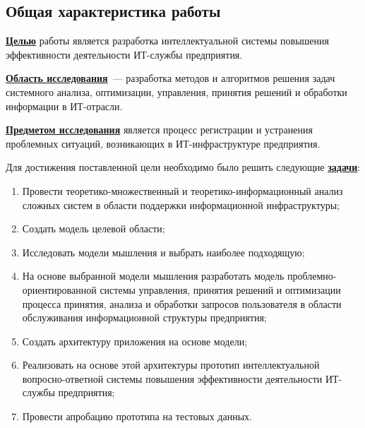 \subsection*{Общая характеристика работы}

\newcommand{\actuality}{\underline{\textbf{Актуальность темы.}}}
\newcommand{\aim}{\underline{\textbf{Целью}}}
\newcommand{\tasks}{\underline{\textbf{задачи}}}
\newcommand{\scope}{\underline{\textbf{Область исследования}}}
\newcommand{\subject}{\underline{\textbf{Предметом исследования}}}

\newcommand{\defpositions}{\underline{\textbf{Основные положения, выносимые на~защиту:}}}
\newcommand{\novelty}{\underline{\textbf{Научная новизна:}}}
\newcommand{\influence}{\underline{\textbf{Практическая значимость}}}
\newcommand{\reliability}{\underline{\textbf{Достоверность}}}
\newcommand{\probation}{\underline{\textbf{Апробация работы.}}}
\newcommand{\contribution}{\underline{\textbf{Личный вклад.}}}
\newcommand{\publications}{\underline{\textbf{Публикации.}}}


{\aim} работы является разработка интеллектуальной системы повышения эффективности деятельности ИТ-службы предприятия. \par
{\scope}~--- разработка методов и алгоритмов решения задач системного анализа, оптимизации, управления, принятия решений и обработки информации в ИТ-отрасли.\par
{\subject}  является процесс регистрации и устранения проблемных ситуаций, возникающих в ИТ-инфраструктуре предприятия.\par

Для достижения поставленной цели необходимо было решить следующие {\tasks}:
\begin{enumerate}
  \item Провести теоретико-множественный и теоретико-информационный анализ сложных систем в области поддержки информационной инфраструктуры;
  \item Создать модель целевой области;
  \item Исследовать модели мышления и выбрать наиболее подходящую;
  \item На основе выбранной модели мышления разработать модель проблемно-ориентированной системы управления, принятия решений и оптимизации процесса принятия, анализа и обработки запросов пользователя в области обслуживания информационной структуры предприятия;
  \item Создать архитектуру приложения на основе модели;
  \item Реализовать на основе этой архитектуры прототип интеллектуальной вопросно-ответной системы повышения эффективности деятельности ИТ-службы предприятия;
  \item Провести апробацию прототипа на тестовых данных.
\end{enumerate}

